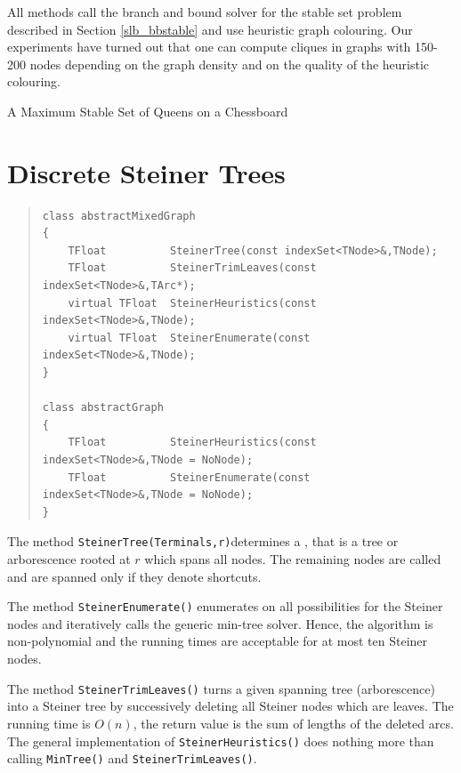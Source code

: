 \documentclass[a4paper,11pt,twoside]{book}
\begin{document}
\begin{multicols}{2}
All methods call the branch and bound solver for the stable set problem
described in Section \ref{slb_bbstable} and use heuristic graph colouring.
Our experiments have turned out that one can compute cliques in graphs with
150-200 nodes depending on the graph density and on the quality of the
heuristic colouring.

\bigskip
\begin{figurehere}
\begin{center}
\epsfxsize=8cm
\vspace{0.5cm}
\caption{\label{flb_queens}A Maximum Stable Set of Queens on a Chessboard}
\end{center}
\end{figurehere}



\section{Discrete Steiner Trees}
\label{slb_steiner}
\methods
\begin{quote}
\begin{verbatim}
class abstractMixedGraph
{
    TFloat          SteinerTree(const indexSet<TNode>&,TNode);
    TFloat          SteinerTrimLeaves(const indexSet<TNode>&,TArc*);
    virtual TFloat  SteinerHeuristics(const indexSet<TNode>&,TNode);
    virtual TFloat  SteinerEnumerate(const indexSet<TNode>&,TNode);
}

class abstractGraph
{
    TFloat          SteinerHeuristics(const indexSet<TNode>&,TNode = NoNode);
    TFloat          SteinerEnumerate(const indexSet<TNode>&,TNode = NoNode);
}
\end{verbatim}
\end{quote}
The method \verb/SteinerTree(Terminals,r)/determines a , that
is a tree or arborescence rooted  at $r$ which spans all  nodes.
The remaining nodes are called  and are spanned only if they
denote shortcuts.

The method \verb/SteinerEnumerate()/ enumerates on all possibilities for the
Steiner nodes and iteratively calls the generic min-tree solver. Hence, the
algorithm is non-polynomial and the running times are acceptable for at most
ten Steiner nodes.

The method \verb/SteinerTrimLeaves()/ turns a given spanning tree
(arborescence) into a Steiner tree by successively deleting all Steiner nodes
which are leaves. The running time is $O(n)$, the return value is the sum of
lengths of the deleted arcs. The general implementation of
\verb/SteinerHeuristics()/ does nothing more than calling \verb/MinTree()/ and
\verb/SteinerTrimLeaves()/.


\end{multicols}
\end{document}
